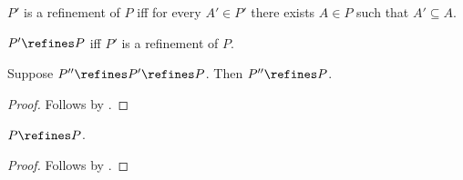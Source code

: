 \begin{definition}\label{partition_refinement}
    $P'$ is a refinement of $P$ iff
    for every $A'\in P'$ there exists
    $A\in P$ such that $A'\subseteq A$.
\end{definition}

\begin{abbreviation}\label{partition_refines}
    $P'\refines P$ iff
    $P'$ is a refinement of $P$.
\end{abbreviation}

\begin{composition}\label{partition_refinement_transitive}
    Suppose $P''\refines P'\refines P$.
    Then $P''\refines P$.
\end{composition}
\begin{proof}
    Follows by .
\end{proof}

\begin{proposition}\label{partition_refinement_reflexive}
    $P\refines P$.
\end{proposition}
\begin{proof}
    Follows by .
\end{proof}

